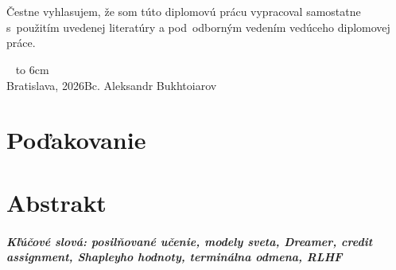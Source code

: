 \documentclass[12pt, twoside, openany]{book}
\def\mfrok{2026}
\def\mfauthor{Bc. Aleksandr Bukhtoiarov}
\def\mfplacedate{Bratislava, \mfrok}
\begin{document}
{~}\vspace{12cm}

\noindent
\begin{minipage}{0.25\textwidth}~\end{minipage}
\thispagestyle{empty}
\begin{minipage}{0.75\textwidth}
Čestne vyhlasujem, že som túto diplomovú prácu vypracoval samostatne s~použitím uvedenej literatúry a pod~odborným vedením vedúceho diplomovej práce.
\newline \newline
\end{minipage}
\vfill
~ \hfill {\hbox to 6cm{\dotfill}} \\
\mfplacedate \hfill \mfauthor
\vfill\eject \cleardoublepage

\newpage
\thispagestyle{empty}
\chapter*{Poďakovanie}\label{chap:thank_you}

\vfill\eject



\newpage
\thispagestyle{empty}
\chapter*{Abstrakt}\label{chap:abstract_sk}

\paragraph*{Kľúčové slová: posilňované učenie, modely sveta, Dreamer, credit assignment, Shapleyho hodnoty, terminálna odmena, RLHF}

\newpage
\tableofcontents

\newpage
\listoffigures
\listoftables



\mainmatter








\backmatter

\nocite{*}


\end{document}
